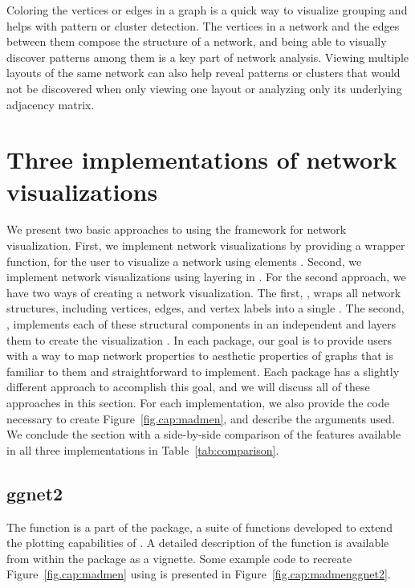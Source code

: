 Coloring the vertices or edges in a graph is a quick way to visualize grouping and helps with pattern or cluster detection. The vertices in a network and the edges between them compose the structure of a network, and being able to visually discover patterns among them is a key part of network analysis. Viewing multiple layouts of the same network can also help reveal patterns or clusters that would not be discovered when only viewing one layout or analyzing only its underlying adjacency matrix.

\section{Three implementations of network visualizations}%
\label{sec:implementations}

We present two basic approaches to using the  framework for network visualization. First, we implement network visualizations by providing a wrapper function,  for the user to visualize a network using  elements \citep{ggally}. Second, we implement network visualizations using layering in .  For the second approach, we have two ways of creating a network visualization. The first, , wraps all network structures, including vertices, edges, and vertex labels into a single . The second, , implements each of these structural components in an independent  and layers them to create the visualization \citep{ggnetwork}. In each package, our goal is to provide users with a way to map network properties to aesthetic properties of graphs that is familiar to them and straightforward to implement. Each package has a slightly different approach to accomplish this goal, and we will discuss all of these approaches in this section. For each implementation, we also provide the code necessary to create Figure~\ref{fig.cap:madmen}, and describe the arguments used. We conclude the section with a side-by-side comparison of the features available in all three implementations in Table~\ref{tab:comparison}.

\subsection{ggnet2} 

The  function is a part of the  package, a suite of functions developed to extend the plotting capabilities of  \citep{ggally}.  A detailed description of the  function is available from within the package as a vignette. Some example code to recreate Figure~\ref{fig.cap:madmen} using  is presented in Figure~\ref{fig.cap:madmenggnet2}. 

